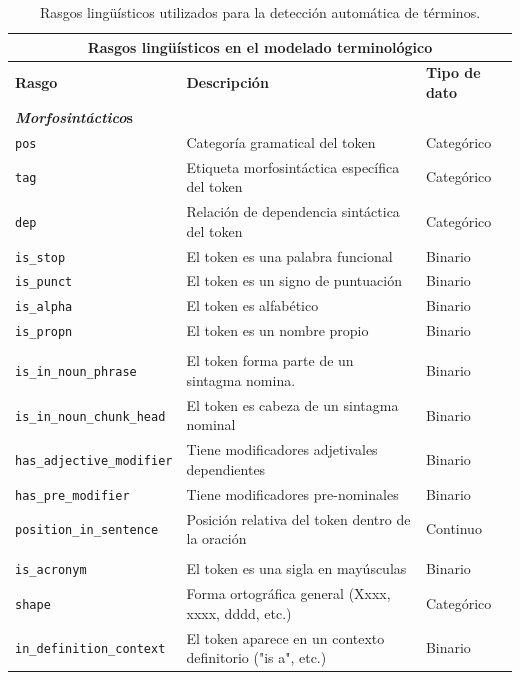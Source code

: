 \begin{table}[H]
\centering
\begingroup
\small
\begin{tabular}{@{}p{5cm}p{6cm}p{3cm}@{}}
\toprule
\multicolumn{3}{c}{\textbf{Rasgos lingüísticos en el modelado terminológico}} \\
\midrule
\textbf{Rasgo} & \textbf{Descripción} & \textbf{Tipo de dato} \\
\midrule
\multicolumn{3}{l}{\textbf{\textit{Morfosintáctico}s}} \\
\texttt{pos} & Categoría gramatical del token & Categórico \\
\texttt{tag} & Etiqueta morfosintáctica específica del token & Categórico \\
\texttt{dep} & Relación de dependencia sintáctica del token & Categórico \\
\texttt{is\_stop} & El token es una palabra funcional & Binario \\
\texttt{is\_punct} & El token es un signo de puntuación & Binario \\
\texttt{is\_alpha} & El token es alfabético & Binario \\
\texttt{is\_propn} & El token es un nombre propio & Binario \\

\addlinespace
\multicolumn{3}{l}{\textbf{\textit{Estructura y función sintáctica}}} \\
\texttt{is\_in\_noun\_phrase} & El token forma parte de un sintagma nomina. & Binario \\
\texttt{is\_in\_noun\_chunk\_head} & El token es cabeza de un sintagma nominal & Binario \\
\texttt{has\_adjective\_modifier} & Tiene modificadores adjetivales dependientes & Binario \\
\texttt{has\_pre\_modifier} & Tiene modificadores pre-nominales & Binario \\
\texttt{position\_in\_sentence} & Posición relativa del token dentro de la oración & Continuo \\

\addlinespace
\multicolumn{3}{l}{\textbf{\textit{Otros rasgos lingüísticos}}} \\
\texttt{is\_acronym} & El token es una sigla en mayúsculas & Binario \\
\texttt{shape} & Forma ortográfica general (Xxxx, xxxx, dddd, etc.) & Categórico \\
\texttt{in\_definition\_context} & El token aparece en un contexto definitorio ("is a", etc.) & Binario \\
\bottomrule
\end{tabular}
\endgroup
\caption{Rasgos lingüísticos utilizados para la detección automática de términos.}
\label{tab:features_linguistic}
\end{table}


